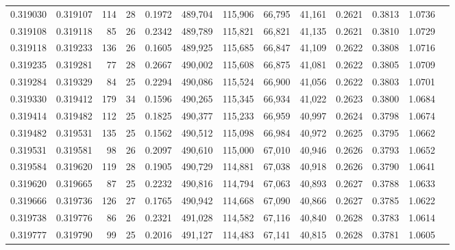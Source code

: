 \begin{tabular}{rrrrrrrrrrrrr}
0.319030 & 0.319107 &   114 &  28 &                                     0.1972 & 489,704 & 115,906 &  66,795 &  41,161 & 0.2621 & 0.3813 & 1.0736 \\
0.319108 & 0.319118 &    85 &  26 &                                     0.2342 & 489,789 & 115,821 &  66,821 &  41,135 & 0.2621 & 0.3810 & 1.0729 \\
0.319118 & 0.319233 &   136 &  26 &                                     0.1605 & 489,925 & 115,685 &  66,847 &  41,109 & 0.2622 & 0.3808 & 1.0716 \\
0.319235 & 0.319281 &    77 &  28 &                                     0.2667 & 490,002 & 115,608 &  66,875 &  41,081 & 0.2622 & 0.3805 & 1.0709 \\
0.319284 & 0.319329 &    84 &  25 &                                     0.2294 & 490,086 & 115,524 &  66,900 &  41,056 & 0.2622 & 0.3803 & 1.0701 \\
0.319330 & 0.319412 &   179 &  34 &                                     0.1596 & 490,265 & 115,345 &  66,934 &  41,022 & 0.2623 & 0.3800 & 1.0684 \\
0.319414 & 0.319482 &   112 &  25 &                                     0.1825 & 490,377 & 115,233 &  66,959 &  40,997 & 0.2624 & 0.3798 & 1.0674 \\
0.319482 & 0.319531 &   135 &  25 &                                     0.1562 & 490,512 & 115,098 &  66,984 &  40,972 & 0.2625 & 0.3795 & 1.0662 \\
0.319531 & 0.319581 &    98 &  26 &                                     0.2097 & 490,610 & 115,000 &  67,010 &  40,946 & 0.2626 & 0.3793 & 1.0652 \\
0.319584 & 0.319620 &   119 &  28 &                                     0.1905 & 490,729 & 114,881 &  67,038 &  40,918 & 0.2626 & 0.3790 & 1.0641 \\
0.319620 & 0.319665 &    87 &  25 &                                     0.2232 & 490,816 & 114,794 &  67,063 &  40,893 & 0.2627 & 0.3788 & 1.0633 \\
0.319666 & 0.319736 &   126 &  27 &                                     0.1765 & 490,942 & 114,668 &  67,090 &  40,866 & 0.2627 & 0.3785 & 1.0622 \\
0.319738 & 0.319776 &    86 &  26 &                                     0.2321 & 491,028 & 114,582 &  67,116 &  40,840 & 0.2628 & 0.3783 & 1.0614 \\
0.319777 & 0.319790 &    99 &  25 &                                     0.2016 & 491,127 & 114,483 &  67,141 &  40,815 & 0.2628 & 0.3781 & 1.0605 \\

\end{tabular}
